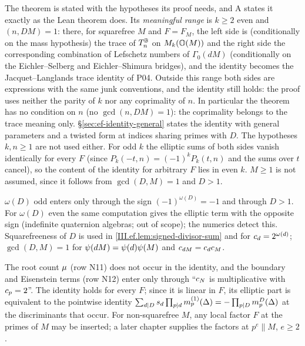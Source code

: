 \begin{remark}\label{rem:ef-range}
The theorem is stated with the hypotheses its proof needs, and A states it exactly as the Lean theorem does. Its \emph{meaningful range} is $k\ge2$
even and $(n,DM)=1$: there, for squarefree $M$ and $F=F_M$, the left side is (conditionally on the mass hypothesis) the trace of $T^{\mathbb{B}}_n$ on $M_{k}(\mathbb{O}(M))$
and the right side the corresponding combination of Lefschetz numbers of $\Gamma_0(dM)$ (conditionally on the Eichler--Selberg and Eichler--Shimura
bridges), and the identity becomes the Jacquet--Langlands trace identity of P04. Outside this range both sides are expressions with the same junk
conventions, and the identity still holds: the proof uses neither the parity of $k$ nor any coprimality of $n$. In particular the theorem has no
condition on $n$ (no $\gcd(n,DM)=1$): the coprimality belongs to the trace meaning only. \S\ref{sec:ef-identity-general} states the identity with
general parameters and a twisted form at indices sharing primes with $D$. The hypotheses $k,n\ge1$ are not used
either. For odd $k$ the elliptic sums of both sides vanish identically for every $F$ (since $P_k(-t,n)=(-1)^kP_k(t,n)$ and the sums over $t$ cancel), so the content of the identity for arbitrary $F$ lies in even $k$. $M\ge1$ is not assumed, since it follows from $\gcd(D,M)=1$ and $D>1$.
\end{remark}
\begin{remark}
$\omega(D)$ odd enters only through the sign $(-1)^{\omega(D)}=-1$ and through $D>1$. For $\omega(D)$ even the same computation gives the elliptic term
with the opposite sign (indefinite quaternion algebras; out of scope); the numerics detect this. Squarefreeness of $D$ is used in
\cref{III.ef.lem:signed-divisor-sum} and for $c_d=2^{\omega(d)}$; $\gcd(D,M)=1$ for $\psi(dM)=\psi(d)\psi(M)$ and $c_{dM}=c_dc_M$.
\end{remark}
\begin{remark}[robustness]
The root count $\mu$ (row N11) does not occur in the identity, and the boundary and Eisenstein terms (row N12) enter only through ``$c_N$ is
multiplicative with $c_p=2$''. The identity holds for every $F$; since it is linear in $F$, its elliptic part is equivalent to the pointwise identity
$\sum_{d\mid D}s_d\prod_{p\mid d}m^{(1)}_p(\Delta)=-\prod_{p\mid D}m^{D}_p(\Delta)$ at the discriminants that occur. For non-squarefree $M$, any local factor $F$
at the primes of $M$ may be inserted; a later chapter supplies the factors at $p^e\parallel M$, $e\ge2$.
\end{remark}

